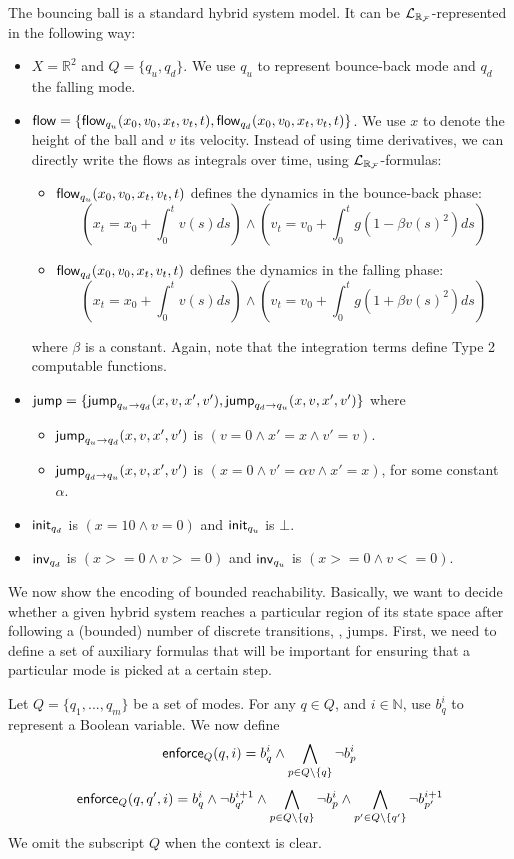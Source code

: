 \begin{example}
The bouncing ball is a standard hybrid system model. It can be $\mathcal{L}_{\mathbb{R}_{\mathcal{F}}}$-represented in the following way:
\begin{itemize}
\item $X = \mathbb{R}^2$ and $Q = \{q_u, q_d\}$. We use $q_u$ to represent bounce-back mode and $q_d$ the falling mode.
\item $\mathsf{flow} = \{\mathsf{flow}_{q_u}(x_0, v_0, x_t, v_t, t), \mathsf{flow}_{q_d}(x_0, v_0, x_t, v_t, t)\}$. We use $x$ to denote the height of the ball and $v$ its velocity. Instead of using time derivatives, we can directly write the flows as integrals over time, using $\mathcal{L}_{\mathbb{R}_{\mathcal{F}}}$-formulas:
\begin{itemize}
\item $\mathsf{flow}_{q_u}(x_0, v_0, x_t, v_t, t)$ defines the dynamics in the bounce-back phase:
$$(x_t = x_0 + \int_0^{t} v(s) ds) \wedge (v_t = v_0 + \int_0^t g(1-\beta v(s)^2) ds)$$
\item $\mathsf{flow}_{q_d}(x_0, v_0, x_t, v_t, t)$ defines the dynamics in the falling phase:
$$(x_t = x_0 + \int_0^{t} v(s) ds) \wedge (v_t = v_0 + \int_0^t g(1+\beta v(s)^2) ds)$$
\end{itemize}where
$\beta$ is a constant. Again, note that the integration terms define Type 2 computable functions.
\item $\mathsf{jump} = \{\mathsf{jump}_{q_u \rightarrow q_d} (x, v, x', v'), \mathsf{jump}_{q_d \rightarrow q_u} (x, v, x', v')\}$ where
\begin{itemize}
\item $\mathsf{jump}_{q_u \rightarrow q_d} (x, v, x', v')$ is $(v= 0 \wedge x' = x \wedge v' = v)$.
\item $\mathsf{jump}_{q_d \rightarrow q_u} (x, v, x', v')$ is $(x= 0 \wedge v' = \alpha v\wedge x'=x)$,  for some constant $\alpha$.
\end{itemize}
\item $\mathsf{init}_{q_d}$ is $(x=10 \wedge v=0)$ and $\mathsf{init}_{q_u}$ is $\bot$.
\item $\mathsf{inv}_{q_d}$ is $(x>=0 \wedge v>=0)$ and $\mathsf{inv}_{q_u}$ is $(x>=0 \wedge v<=0)$.
\end{itemize}
\end{example}

We now show the encoding of bounded reachability. Basically, we want to decide whether a given 
hybrid system reaches a particular region of its state space after following a (bounded) number
of discrete transitions, \ie, jumps. First, we need to define a set of auxiliary formulas that 
will be important for ensuring that a particular mode is picked at a certain step.
\begin{definition}
Let $Q = \{q_1,...,q_m\}$ be a set of modes. For any $q\in Q$, and $i\in\mathbb{N}$, use  $b_{q}^i$ to represent a Boolean variable. We now define
$$\mathsf{enforce}_Q(q,i) = b^i_{q} \wedge \bigwedge_{p\in Q\setminus\{q\}}\neg b^{i}_{p}$$
$$\mathsf{enforce}_Q(q, q',i) = b^{i}_{q}\wedge \neg b^{i+1}_{q'} \wedge \bigwedge_{p\in Q\setminus\{q\}} \neg b^i_{p} \wedge \bigwedge_{p'\in Q\setminus\{q'\}} \neg b^{i+1}_{p'}$$
We omit the subscript $Q$ when the context is clear.\end{definition}

